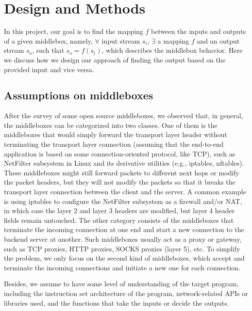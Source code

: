 \section{Design and Methods}

In this project, our goal is to find the mapping $f$ between the inputs and
outputs of a given middlebox, namely, $\forall$ input stream $s_i$, $\exists$
a mapping $f$ and an output stream $s_o$, such that $s_o = f(s_i)$, which
describes the middlebox behavior. Here we discuss how we design our approach of
finding the output based on the provided input and vice versa.


\subsection{Assumptions on middleboxes}

After the survey of some open source middleboxes, we observed that, in general,
the middleboxes can be categorized into two classes. One of them is the
middleboxes that would simply forward the transport layer header without
terminating the transport layer connection (assuming that the end-to-end
application is based on some connection-oriented protocol, like TCP), such as
NetFilter subsystem in Linux and its derivative utilities (e.g., iptables,
nftables). These middleboxes might still forward packets to different next hops
or modify the packet headers, but they will not modify the packets so that it
breaks the transport layer connection between the client and the server. A
common example is using iptables to configure the NetFilter subsystem as a
firewall and/or NAT, in which case the layer 2 and layer 3 headers are modified,
but layer 4 header fields remain untouched. The other category consists of the
middleboxes that terminate the incoming connection at one end and start a new
connection to the backend server at another. Such middleboxes usually act as a
proxy or gateway, such as TCP proxies, HTTP proxies, SOCKS proxies (layer 5),
etc. To simplify the problem, we only focus on the second kind of middleboxes,
which accept and terminate the incoming connections and initiate a new one for
each connection.

Besides, we assume to have some level of understanding of the target program,
including the instruction set architecture of the program, network-related APIs
or libraries used, and the functions that take the inputs or decide the outputs.


